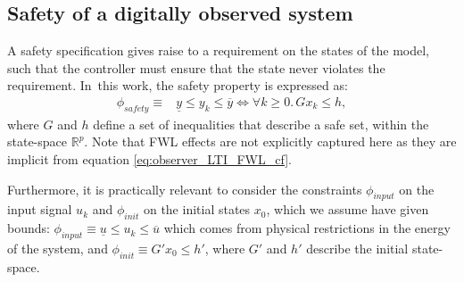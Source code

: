 \documentclass[sigconf]{llncs}
\newcommand{\mat}[1]{{#1}}
\renewcommand{\vec}[1]{{#1}}
\begin{document}
\subsection{Safety of a digitally observed system}\label{sec:cof_safety}
A safety specification gives raise to a requirement on the
states of the model, such that the controller
must ensure that the state never violates the
requirement.
In~this work, the safety property is expressed as:
%
\begin{align}
  \phi_\mathit{safety}\equiv& \underline{y} \leq y_k \leq \overline{y}
\iff \forall k\geq 0.\, \mat{G}\vec{x}_k \leq \vec{h},
\label{eq:safetyspec}
\end{align}
%
where $\mat{G}$ and $\vec{h}$ define a set of inequalities that describe 
a safe set, within the state-space $\mathbb{R}^p$.
%
Note that FWL effects are not explicitly captured here
as they are implicit from equation \ref{eq:observer_LTI_FWL_cf}.

Furthermore, it is practically relevant to consider the 
constraints $\phi_\mathit{input}$ on the input
signal $u_{k}$ and $\phi_\mathit{init}$ on the initial states $x_0$,
which we assume have given bounds:
$\phi_\mathit{input}\equiv \underline{u} \leq u_k \leq \overline{u}$
which comes from physical restrictions in the energy of the system, and
$\phi_\mathit{init}\equiv \mat{G}' \vec{x}_0 \leq \vec{h}'$,
where $\mat{G}'$ and $\vec{h}'$ describe the initial state-space.

%
%
\end{document}
